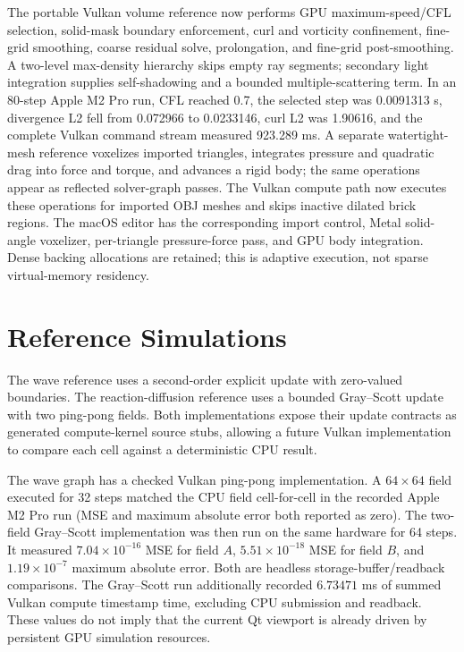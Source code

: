 \documentclass[10pt]{article}
\begin{document}
The portable Vulkan volume reference now performs GPU maximum-speed/CFL selection, solid-mask
boundary enforcement, curl and vorticity confinement, fine-grid smoothing, coarse residual solve,
prolongation, and fine-grid post-smoothing. A two-level max-density hierarchy skips empty ray
segments; secondary light integration supplies self-shadowing and a bounded multiple-scattering
term. In an 80-step Apple M2 Pro run, CFL reached 0.7, the selected step was 0.0091313 s,
divergence L2 fell from 0.072966 to 0.0233146, curl L2 was 1.90616, and the complete Vulkan command
stream measured 923.289 ms. A separate watertight-mesh reference voxelizes imported triangles,
integrates pressure and quadratic drag into force and torque, and advances a rigid body; the same
operations appear as reflected solver-graph passes. The Vulkan compute path now executes these
operations for imported OBJ meshes and skips inactive dilated brick regions. The macOS editor has
the corresponding import control, Metal solid-angle voxelizer, per-triangle pressure-force pass,
and GPU body integration. Dense backing allocations are retained; this is adaptive execution, not
sparse virtual-memory residency.

\section{Reference Simulations}

The wave reference uses a second-order explicit update with zero-valued boundaries. The
reaction-diffusion reference uses a bounded Gray--Scott update with two ping-pong fields. Both
implementations expose their update contracts as generated compute-kernel source stubs, allowing a
future Vulkan implementation to compare each cell against a deterministic CPU result.

The wave graph has a checked Vulkan ping-pong implementation. A $64\times64$ field executed for
32 steps matched the CPU field cell-for-cell in the recorded Apple M2 Pro run (MSE and maximum
absolute error both reported as zero). The two-field Gray--Scott implementation was then run on
the same hardware for 64 steps. It measured $7.04\times10^{-16}$ MSE for field $A$,
$5.51\times10^{-18}$ MSE for field $B$, and $1.19\times10^{-7}$ maximum absolute error. Both are
headless storage-buffer/readback comparisons. The Gray--Scott run additionally recorded $6.73471$
ms of summed Vulkan compute timestamp time, excluding CPU submission and readback. These values do
not imply that the current Qt viewport is already driven by persistent GPU simulation resources.
\end{document}
